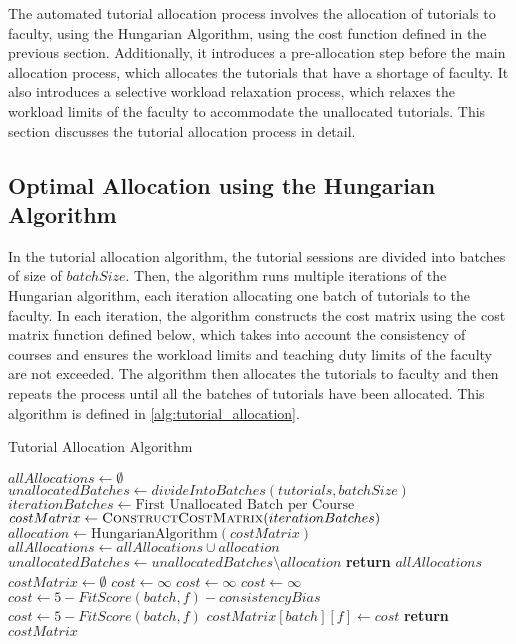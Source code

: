 The automated tutorial allocation process involves the allocation of tutorials to faculty, using the Hungarian Algorithm, using the cost function defined in the previous section. Additionally, it introduces a pre-allocation step before the main allocation process, which allocates the tutorials that have a shortage of faculty. It also introduces a selective workload relaxation process, which relaxes the workload limits of the faculty to accommodate the unallocated tutorials. This section discusses the tutorial allocation process in detail.

\subsection{Optimal Allocation using the Hungarian Algorithm}

In the tutorial allocation algorithm, the tutorial sessions are divided into batches of size of $batchSize$. Then, the algorithm runs multiple iterations of the Hungarian algorithm, each iteration allocating one batch of tutorials to the faculty. In each iteration, the algorithm constructs the cost matrix using the cost matrix function defined below, which takes into account the consistency of courses and ensures the workload limits and teaching duty limits of the faculty are not exceeded. The algorithm then allocates the tutorials to faculty and then repeats the process until all the batches of tutorials have been allocated. This algorithm is defined in \autoref{alg:tutorial_allocation}.

\begin{algorithm}[H]
  \caption{Tutorial Allocation Algorithm}
  \begin{algorithmic}
    \State $allAllocations \gets \emptyset$
    \State $unallocatedBatches \gets divideIntoBatches(tutorials, batchSize)$
    \State $iterationBatches \gets \text{First Unallocated Batch per Course}$
    \State $costMatrix \gets \Call{ConstructCostMatrix}{iterationBatches}$
    \State $allocation \gets \text{HungarianAlgorithm}(costMatrix)$
    \State $allAllocations \gets allAllocations \cup allocation$
    \State $unallocatedBatches \gets unallocatedBatches \setminus allocation$
    \EndWhile
    \State \textbf{return} $allAllocations$
    \EndProcedure
    \\
    \State $costMatrix \gets \emptyset$
    \State $cost \gets \infty$
    \State $cost \gets \infty$
    \State $cost \gets \infty$
    \State $cost \gets 5 - FitScore(batch, f) - consistencyBias$
    \Else
    \State $cost \gets 5 - FitScore(batch, f)$
    \EndIf
    \State $costMatrix[batch][f] \gets cost$
    \EndFor
    \EndFor
    \State \textbf{return} $costMatrix$
    \EndProcedure
  \end{algorithmic}
  \label{alg:tutorial_allocation}
\end{algorithm}

